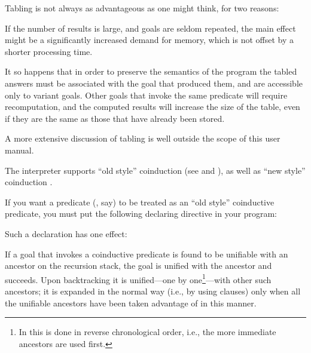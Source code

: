 Tabling is not always as advantageous as one might think, for two reasons:
  \begin{Enumerate}
  \item
    If the number of results is large, and goals are seldom repeated, the
    main effect might be a significantly increased demand for memory, which
    is not offset by a shorter processing time.

  \item It so happens that in order to preserve the semantics of the program
    the tabled answers must be associated with the goal that produced them,
    and are accessible only to variant goals.  Other goals that invoke the
    same predicate will require recomputation, and the computed results will
    increase the size of the table, even if they are the same as those that
    have already been stored.
  \end{Enumerate}


A more extensive discussion of tabling is well outside the scope of this user
manual.



%
%

The interpreter supports ``old style'' coinduction (see \cite{coinductive}
and \cite{co-LP}), as well as ``new style'' coinduction
\cite{gupta-coinductive-personal}.

If you want a predicate (, say) to be treated as an ``old style''
coinductive predicate, you must put the following declaring directive in your
program:\\
\ind{}%
\label{dir:coinductive}

Such a declaration has one effect:
\begin{Itemize}
  \item
    If a goal that invokes a coinductive predicate is found to be unifiable
    with an ancestor on the recursion stack, the goal is unified with the
    ancestor and succeeds.  Upon backtracking it is unified---one by
    one\footnote{
      In  this is done in reverse chronological order, i.e.,
      the more immediate ancestors are used first.
    }---with other such ancestors;
    it is expanded in the normal way (i.e., by
    using clauses) only when all the unifiable ancestors have been taken
    advantage of in this manner.
\end{Itemize}

